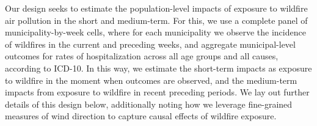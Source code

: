 \documentclass[11pt]{article}
\begin{document}
\begin{spacing}{1.3}

Our design seeks to estimate the population-level impacts of exposure to wildfire air pollution in the short and medium-term.  For this, we use a complete panel of municipality-by-week cells, where for each municipality we observe the incidence of wildfires in the current and preceding weeks, and aggregate municipal-level outcomes for rates of hospitalization across all age groups and all causes, according to ICD-10. In this way, we estimate the short-term impacts as exposure to wildfire in the moment when outcomes are observed, and the medium-term impacts from exposure to wildfire in recent preceding periods. We lay out further details of this design below, additionally noting how we leverage fine-grained measures of wind direction to capture causal effects of wildfire exposure.



\end{spacing}
\end{document}

